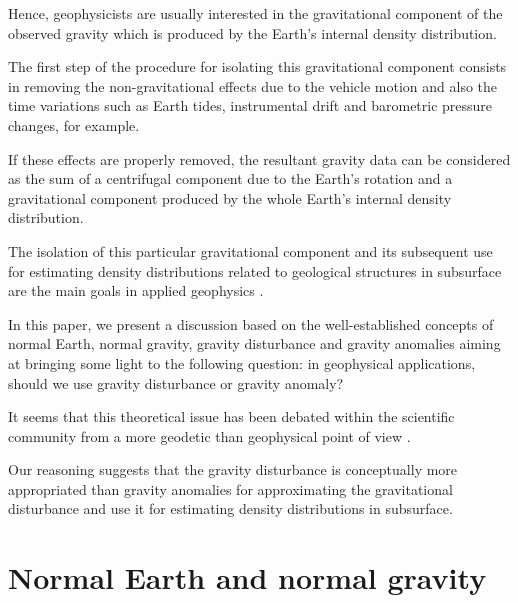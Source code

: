 \documentclass[manuscript]{geophysics}
\begin{document}
Hence, geophysicists are usually interested 
in the gravitational component of the observed gravity 
which is produced by the Earth's internal 
density distribution.


%


The first step of the procedure for isolating this 
gravitational component consists in removing the non-gravitational 
effects due to the vehicle motion and also the time variations 
such as Earth tides, instrumental drift and barometric 
pressure changes, for example.


If these effects are properly removed, the resultant 
gravity data can be considered as the sum of a 
centrifugal component due to the Earth's rotation and
a gravitational component produced by the whole Earth's
internal density distribution.


The isolation of this particular gravitational component 
and its subsequent use for estimating density 
distributions related to geological structures in subsurface 
are the main goals in applied geophysics 
\citep{blakely1996}.


In this paper, we present a discussion based on the
well-established concepts of normal Earth, normal gravity, gravity disturbance and gravity anomalies aiming at bringing some
light to the following question: in geophysical applications,
should we use gravity disturbance or gravity anomaly?


It seems that this theoretical issue has been 
debated within the scientific community from a 
more geodetic than geophysical point of view
\citep{lafehr1991, chapin1996, li2001, fairhead2003,
hackney-featherstone2003, hinze2005}.


Our reasoning suggests that the gravity 
disturbance is conceptually more appropriated than 
gravity anomalies for approximating
the gravitational disturbance and use it for estimating 
density distributions in subsurface.


\section{Normal Earth and normal gravity}
\end{document}
